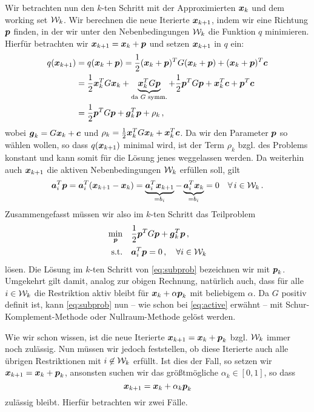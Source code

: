 Wir betrachten nun den $k$-ten Schritt mit der Approximierten $\boldsymbol x_k$ und dem working set $\mathcal W_k$. Wir berechnen die neue Iterierte $\boldsymbol x_{k+1}$, indem wir eine Richtung $\boldsymbol p$ finden, in der wir unter den Nebenbedingungen $\mathcal W_k$ die Funktion $q$ minimieren. Hierfür betrachten wir $\boldsymbol x_{k+1} = \boldsymbol x_k + \boldsymbol p$ und setzen $\boldsymbol x_{k+1}$ in $q$ ein:
\begin{align*}
	 q(\boldsymbol x_{k+1}) & = q(\boldsymbol x_k+\boldsymbol p) = \frac 1 2 (\boldsymbol x_k + \boldsymbol p)^T G (\boldsymbol x_k + \boldsymbol p) + (\boldsymbol x_k + \boldsymbol p)^T \boldsymbol c \\
	& = \frac 1 2 \boldsymbol x^T_k G \boldsymbol x_k + \underbrace{\boldsymbol x_k^T G \boldsymbol p}_{\text{da $G$ symm.}} + \frac 1 2 \boldsymbol p^T G\boldsymbol p +\boldsymbol x_k^T \boldsymbol c +\boldsymbol p^T \boldsymbol c \\
	& = \frac 1 2\boldsymbol p^T G \boldsymbol p +\boldsymbol  g_k^T \boldsymbol p + \rho_k \, ,
\end{align*}
wobei $\boldsymbol g_k = G\boldsymbol x_k+\boldsymbol c$ und $\rho_k = \frac 1 2 \boldsymbol x_k^T G \boldsymbol x_k + \boldsymbol x_k^T \boldsymbol c$. Da wir den Parameter $\boldsymbol p$ so wählen wollen, so dass $q(\boldsymbol x_{k+1})$ minimal wird, ist der Term $\rho_k$ bzgl. des Problems konstant und  kann somit für die Lösung jenes weggelassen werden. Da weiterhin auch $\boldsymbol x_{k+1}$ die aktiven Nebenbedingungen $\mathcal W_k$ erfüllen soll, gilt
\[
	\boldsymbol a_i^T \boldsymbol p =\boldsymbol a_i^T (\boldsymbol x_{k+1} - \boldsymbol x_k) = \underbrace{\boldsymbol a_i^T\boldsymbol x_{k+1}}_{=b_i} - \underbrace{\boldsymbol a_i^T \boldsymbol x_k}_{=b_i} = 0 \quad \forall \, i \in \mathcal W_k \, .
\]
Zusammengefasst müssen wir also im $k$-ten Schritt das Teilproblem
\begin{align}\label{eq:subprob}
\begin{aligned}
	\min_{\boldsymbol p} & \quad \frac 1 2\boldsymbol p^T G \boldsymbol p + \boldsymbol g_k^T \boldsymbol p \, , \\
	\text{s.t.} & \quad \boldsymbol a_i^T\boldsymbol p = 0 \, , \quad \forall i \in \mathcal W_k 
\end{aligned}
\end{align}
lösen. Die Lösung im $k$-ten Schritt von \eqref{eq:subprob} bezeichnen wir mit $\boldsymbol p_k$. Umgekehrt gilt damit, analog zur obigen Rechnung, natürlich auch, dass für alle $i \in \mathcal W_k$ die Restriktion aktiv bleibt für $\boldsymbol x_k + \alpha \boldsymbol p_k$ mit beliebigem $\alpha$. Da $G$ positiv definit ist, kann \eqref{eq:subprob} nun – wie schon bei \eqref{eq:active} erwähnt – mit Schur-Komplement-Methode oder Nullraum-Methode gelöst werden.

Wie wir schon wissen, ist die neue Iterierte $\boldsymbol x_{k+1} = \boldsymbol x_k + \boldsymbol p_k$ bzgl. $\mathcal W_k$ immer noch zulässig. Nun müssen wir jedoch feststellen, ob diese Iterierte auch alle übrigen Restriktionen mit $i\not\in \mathcal W_k$ erfüllt. Ist dies der Fall, so setzen wir $\boldsymbol x_{k+1} = \boldsymbol x_k +\boldsymbol p_k$, ansonsten suchen wir das größtmögliche $\alpha_k \in [0,1]$, so dass
\[
	\boldsymbol x_{k+1} =\boldsymbol x_k + \alpha_k \boldsymbol p_k
\] 
zulässig bleibt. Hierfür betrachten wir zwei Fälle.

